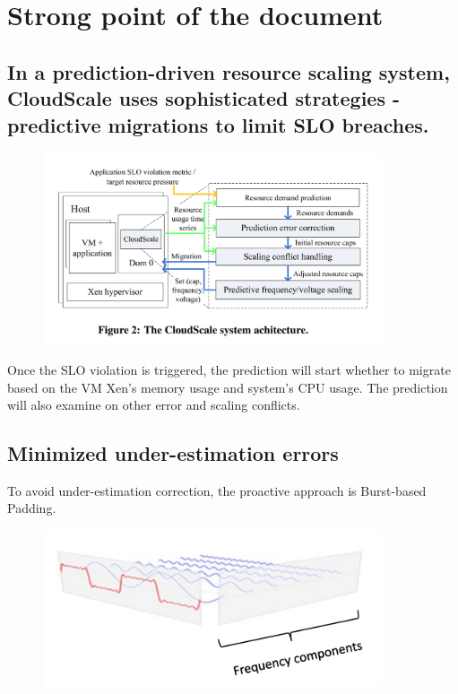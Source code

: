 \documentclass[acmlarge]{acmart}
\begin{document}
\maketitle
\section{Strong point of the document}
\subsection{In a prediction-driven resource scaling system, CloudScale uses sophisticated strategies - predictive migrations to limit SLO breaches.}
\begin{figure}[htbp]
  \centering
  \includegraphics[width=10cm]{./overview.png}
\end{figure}
Once the SLO violation is triggered, the prediction will start whether to migrate based on the VM Xen's memory usage and system's CPU usage. The prediction will also examine on other error and scaling conflicts.
\subsection{Minimized under-estimation errors}
To avoid under-estimation correction, the proactive approach is Burst-based Padding. 
\begin{figure}[htbp]
  \centering
  \includegraphics[width=10cm]{./prediction.png}
\end{figure}
\end{document}
